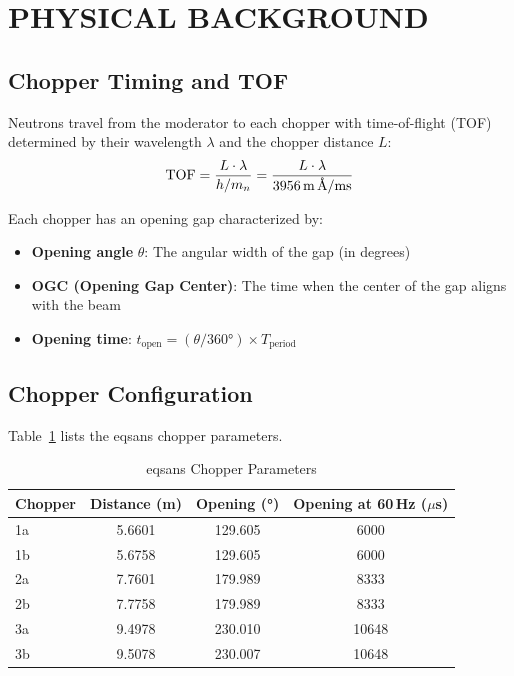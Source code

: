 \documentclass[tm]{ornltm}
\begin{document}
\section{PHYSICAL BACKGROUND}

\subsection{Chopper Timing and TOF}

Neutrons travel from the moderator to each chopper with time-of-flight (TOF) determined by their wavelength $\lambda$ and the chopper distance $L$:
\begin{equation}
    \text{TOF} = \frac{L \cdot \lambda}{h/m_n} = \frac{L \cdot \lambda}{3956\,\text{m\,\AA/ms}}
\end{equation}

Each chopper has an opening gap characterized by:
\begin{itemize}
    \item \textbf{Opening angle} $\theta$: The angular width of the gap (in degrees)
    \item \textbf{OGC (Opening Gap Center)}: The time when the center of the gap aligns with the beam
    \item \textbf{Opening time}: $t_{\text{open}} = (\theta/360°) \times T_{\text{period}}$
\end{itemize}

\subsection{Chopper Configuration}

Table~\ref{tab:choppers} lists the \ac{eqsans} chopper parameters.

\begin{table}[ht]
\centering

\caption{\ac{eqsans} Chopper Parameters}
\label{tab:choppers}
\begin{tabular}{lccc}
\toprule
Chopper & Distance (m) & Opening (°) & Opening at 60\,Hz ($\mu$s) \\
\midrule
1a & 5.6601 & 129.605 & 6000 \\
1b & 5.6758 & 129.605 & 6000 \\
2a & 7.7601 & 179.989 & 8333 \\
2b & 7.7758 & 179.989 & 8333 \\
3a & 9.4978 & 230.010 & 10648 \\
3b & 9.5078 & 230.007 & 10648 \\
\bottomrule
\end{tabular}

\end{table}
\end{document}
